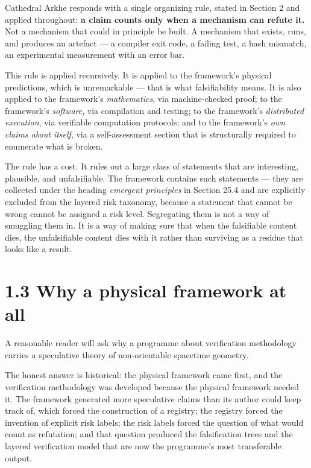 \documentclass[
  11pt]{report}
\begin{document}
Cathedral Arkhe responds with a single organizing rule, stated in
Section 2 and applied throughout: \textbf{a claim counts only when a
mechanism can refute it.} Not a mechanism that could in principle be
built. A mechanism that exists, runs, and produces an artefact --- a
compiler exit code, a failing test, a hash mismatch, an experimental
measurement with an error bar.

This rule is applied recursively. It is applied to the framework's
physical predictions, which is unremarkable --- that is what
falsifiability means. It is also applied to the framework's
\emph{mathematics}, via machine-checked proof; to the framework's
\emph{software}, via compilation and testing; to the framework's
\emph{distributed execution}, via verifiable computation protocols; and
to the framework's \emph{own claims about itself}, via a self-assessment
section that is structurally required to enumerate what is broken.

The rule has a cost. It rules out a large class of statements that are
interesting, plausible, and unfalsifiable. The framework contains such
statements --- they are collected under the heading \emph{emergent
principles} in Section 25.4 and are explicitly excluded from the layered
risk taxonomy, because a statement that cannot be wrong cannot be
assigned a risk level. Segregating them is not a way of smuggling them
in. It is a way of making sure that when the falsifiable content dies,
the unfalsifiable content dies with it rather than surviving as a
residue that looks like a result.

\hypertarget{why-a-physical-framework-at-all}{%
\section{1.3 Why a physical framework at
all}\label{why-a-physical-framework-at-all}}

A reasonable reader will ask why a programme about verification
methodology carries a speculative theory of non-orientable spacetime
geometry.

The honest answer is historical: the physical framework came first, and
the verification methodology was developed because the physical
framework needed it. The framework generated more speculative claims
than its author could keep track of, which forced the construction of a
registry; the registry forced the invention of explicit risk labels; the
risk labels forced the question of what would count as refutation; and
that question produced the falsification trees and the layered
verification model that are now the programme's most transferable
output.
\end{document}
